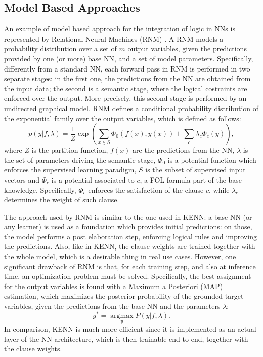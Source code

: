  \subsection{Model Based Approaches}
 An example of model based approach for the integration of logic in NNs is represented by Relational Neural Machines (RNM) \cite{marra2020relational}. A RNM models a probability distribution over a set of $m$ output variables, given the predictions provided by one (or more) base NN, and a set of model parameters. Specifically, differently from a standard NN, each forward pass in RNM is performed in two separate stages: in the first one, the predictions from the NN are obtained from the input data; the second is a semantic stage, where the logical costraints are enforced over the output. More precisely, this second stage is performed by an undirected graphical model.
 RNM defines a conditional probability distribution of the exponential family over the output variables, which is defined as follows:
 \begin{equation*}
 p(y|f,\lambda) = \frac{1}{Z} \exp \left( \sum_{x \in S}\Phi_0(f(x),y(x))+\sum_c \lambda_c \Phi_c(y) \right), 
 \end{equation*}
 where $Z$ is the partition function, $f(x)$ are the predictions from the NN, $\lambda$ is the set of parameters driving the semantic stage, $\Phi_0$ is a potential function which enforces the supervised learning paradigm, $S$ is the subset of supervised input vectors and $\Phi_c$ is a potential associated to $c$, a FOL formula part of the base knowledge. Specifically, $\Phi_c$ enforces the satisfaction of the clause $c$, while $\lambda_c$ determines the weight of such clause. 
 
 The approach used by RNM is similar to the one used in KENN: a base NN (or any learner) is used as a foundation which provides initial predictions: on those, the model performs a post elaboration step, enforcing logical rules and improving the predictions. Also, like in KENN, the clause weights are trained together with the whole model, which is a desirable thing in real use cases. However, one significant drawback of RNM is that, for each training step, and also at inference time, an optimization problem must be solved. 
Specifically, the best assignment for the output variables is found with a Maximum a Posteriori (MAP) estimation, which maximizes the posterior probability of the grounded target variables, given the predictions from the base NN and the parameters $\lambda$:
 \begin{equation*}
 y^* = \underset{y}{\operatorname{argmax}}P(y|f,\lambda).
 \end{equation*}
 In comparison, KENN is much more efficient since it is implemented as an actual layer of the NN architecture, which is then trainable end-to-end, together with the clause weights.
 
